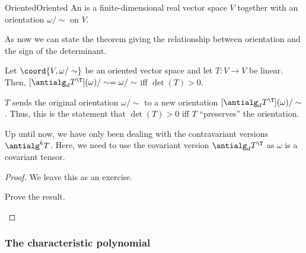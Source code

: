 \begin{dfn}{Oriented}{Oriented}
	An  is a finite-dimensional real vector space $V$ together with an orientation $\omega /\sim$ on $V$.
\end{dfn}
As now we can state the theorem giving the relationship between orientation and the sign of the determinant.
\begin{thm}{}{}
	Let $\coord{V,\omega /\sim}$ be an oriented vector space and let $T\colon V\rightarrow V$ be linear.  Then, $[\antialg _dT^{\T}](\omega )/\sim =\omega /\sim$ iff $\det (T)>0$.
	\begin{rmk}
		$T$ sends the original orientation $\omega /\sim$ to a new orientation $[\antialg _dT^{\T}](\omega )/\sim$.  Thus, this is the statement that $\det (T)>0$ iff $T$ ``preserves'' the orientation.
	\end{rmk}
	\begin{rmk}
		Up until now, we have only been dealing with the contravariant versions $\antialg ^kT$.  Here, we need to use the covariant version $\antialg _dT^{\T}$ as $\omega$ is a covariant tensor.
	\end{rmk}
	\begin{proof}
		We leave this as an exercise.
		\begin{exr}[breakable=false]{}{}
			Prove the result.
		\end{exr}
	\end{proof}
\end{thm}

\subsubsection{The characteristic polynomial}

